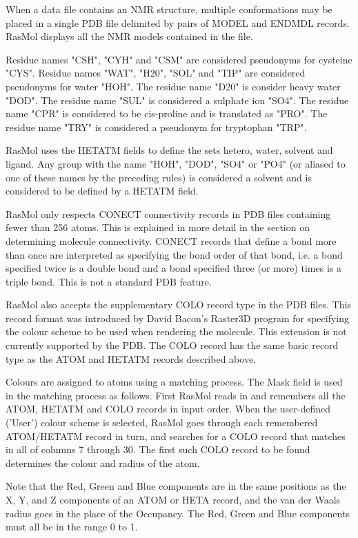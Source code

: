 When a data file contains an NMR structure, multiple conformations may
be placed in a single PDB file delimited by pairs of MODEL and ENDMDL
records. RasMol displays all the NMR models contained in the file.

Residue names "CSH", "CYH" and "CSM" are considered pseudonyms for
cysteine "CYS". Residue names "WAT", "H20", "SOL" and "TIP" are
considered pseudonyms for water "HOH". The residue name "D20" is
consider heavy water "DOD". The residue name "SUL" is considered a
sulphate ion "SO4". The residue name "CPR" is considered to be
cis-proline and is translated as "PRO". The residue name "TRY" is
considered a pseudonym for tryptophan "TRP".

RasMol uses the HETATM fields to define the sets hetero, water, solvent
and ligand. Any group with the name "HOH", "DOD", "SO4" or "PO4" (or
aliased to one of these names by the preceding rules) is considered a
solvent and is considered to be defined by a HETATM field.

RasMol only respects CONECT connectivity records in PDB files containing
fewer than 256 atoms. This is explained in more detail in the section on
determining molecule connectivity. CONECT records that define a bond
more than once are interpreted as specifying the bond order of that
bond, i.e. a bond specified twice is a double bond and a bond specified
three (or more) times is a triple bond.  This is not a standard PDB feature.

RasMol also accepts the supplementary COLO record type in the PDB
files. This record format was introduced by David Bacon's Raster3D
program for specifying the colour scheme to be used when rendering the
molecule. This extension is not currently supported by the PDB. The
COLO record has the same basic record type as the ATOM and HETATM
records described above.

Colours are assigned to atoms using a matching process. The Mask field
is used in the matching process as follows. First RasMol reads in and
remembers all the ATOM, HETATM and COLO records in input order. When the
user-defined ('User') colour scheme is selected, RasMol goes through
each remembered ATOM/HETATM record in turn, and searches for a COLO
record that matches in all of columns 7 through 30. The first such COLO
record to be found determines the colour and radius of the atom.

Note that the Red, Green and Blue components are in the same positions
as the X, Y, and Z components of an ATOM or HETA record, and the van
der Waals radius goes in the place of the Occupancy. The Red, Green and
Blue components must all be in the range 0 to 1.

